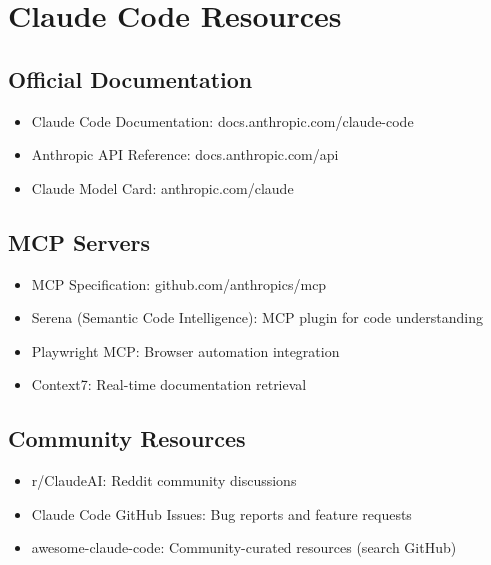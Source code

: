 \chapter{Claude Code Resources}

\section{Official Documentation}

\begin{itemize}
    \item Claude Code Documentation: docs.anthropic.com/claude-code
    \item Anthropic API Reference: docs.anthropic.com/api
    \item Claude Model Card: anthropic.com/claude
\end{itemize}

\section{MCP Servers}

\begin{itemize}
    \item MCP Specification: github.com/anthropics/mcp
    \item Serena (Semantic Code Intelligence): MCP plugin for code understanding
    \item Playwright MCP: Browser automation integration
    \item Context7: Real-time documentation retrieval
\end{itemize}

\section{Community Resources}

\begin{itemize}
    \item r/ClaudeAI: Reddit community discussions
    \item Claude Code GitHub Issues: Bug reports and feature requests
    \item awesome-claude-code: Community-curated resources (search GitHub)
\end{itemize}


